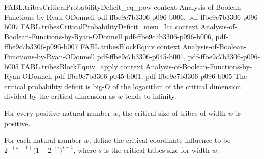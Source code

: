 \begin{theorem}
  {FABL.tribesCriticalProbabilityDeficit_eq_pow}
  {context}
  {Analysis-of-Boolean-Functions-by-Ryan-ODonnell}
  {pdf-ffbe9c7b3306-p096-b006,
    pdf-ffbe9c7b3306-p096-b007}
\proofstep
  {FABL.tribesCriticalProbabilityDeficit_mem_Icc}
  {context}
  {Analysis-of-Boolean-Functions-by-Ryan-ODonnell}
  {pdf-ffbe9c7b3306-p096-b006,
    pdf-ffbe9c7b3306-p096-b007}
\proofstep
  {FABL.tribesBlockEquiv}
  {context}
  {Analysis-of-Boolean-Functions-by-Ryan-ODonnell}
  {pdf-ffbe9c7b3306-p045-b001,
    pdf-ffbe9c7b3306-p096-b005}
\proofstep
  {FABL.tribesBlockEquiv_apply}
  {context}
  {Analysis-of-Boolean-Functions-by-Ryan-ODonnell}
  {pdf-ffbe9c7b3306-p045-b001,
    pdf-ffbe9c7b3306-p096-b005}
The critical probability deficit is big-O of the logarithm of the critical dimension
divided by the critical dimension as $w$ tends to infinity.
\end{theorem}

\begin{theorem}
\label{FABL.tribesCriticalSize_pos}
\leanok
{}
For every positive natural number $w$, the critical size of tribes of width $w$ is
positive.
\end{theorem}

\begin{definition}
\label{FABL.tribesCriticalCoordinateInfluence}
\leanok
{}
For each natural number $w$, define the critical coordinate influence to be
$2^{-(w-1)}\bigl(1-2^{-w}\bigr)^{s-1}$, where $s$ is the critical tribes size for width
$w$.
\end{definition}

